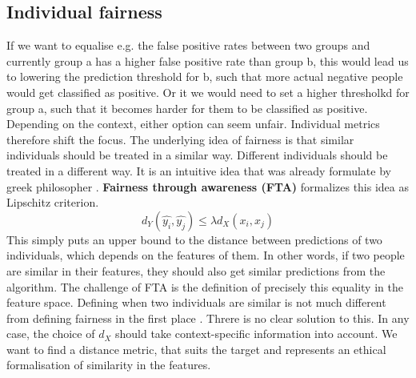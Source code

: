 \subsection*{Individual fairness}
If we want to equalise e.g. the false positive rates between two groups and currently group a has a higher false positive rate than group b, this would lead us to lowering the prediction threshold for b, such that more actual negative people would get classified as positive. Or it we would need to set a higher thresholkd for group a, such that it becomes harder for them to be classified as positive. Depending on the context, either option can seem unfair. Individual metrics therefore shift the focus. The underlying idea of fairness is that similar individuals should be treated in a similar way. Different individuals should be treated in a different way. It is an intuitive idea that was already formulate by greek philosopher {\color{red}{bothmann citation}}.
\textbf{Fairness through awareness (FTA)} formalizes this idea as Lipschitz criterion. $$d_Y(\hat{y_i}, \hat{y_j}) \leq \lambda {d_X}(x_i, x_j)$$
This simply puts an upper bound to the distance between predictions of two individuals, which depends on the features of them. In other words, if two people are similar in their features, they should also get similar predictions from the algorithm. The challenge of FTA is the definition of precisely this equality in the feature space. Defining when two individuals are similar is not much different from defining fairness in the first place \cite{castelnovo2022}. 
Threre is no clear solution to this. In any case, the choice of $d_X$ should take context-specific information into account. We want to find a distance metric, that suits the target and represents an ethical formalisation of similarity in the features.

